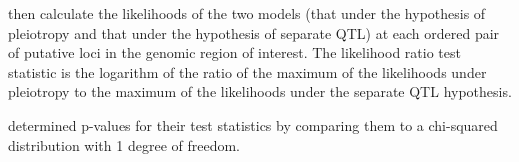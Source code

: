 \documentclass[]{article}\usepackage[]{graphicx}\usepackage[]{color}
\begin{document}
\citet{jiang1995multiple} then calculate the likelihoods of the two models
(that under the hypothesis of pleiotropy and that under the hypothesis of separate QTL)
at each ordered pair of putative loci in the genomic region of interest.
The likelihood ratio test statistic is the logarithm of the ratio of the maximum
of the likelihoods under pleiotropy to the maximum of the likelihoods under
the separate QTL hypothesis. 

\citet{jiang1995multiple} determined p-values for their test statistics by comparing
them to a chi-squared distribution with 1 degree of freedom. 





\printbibliography
\end{document}
